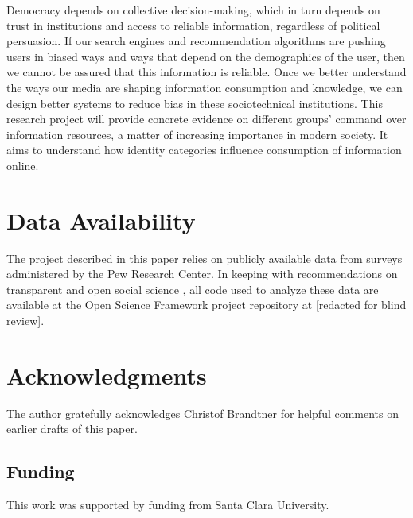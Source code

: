 \documentclass[11pt]{article}
\begin{document}
Democracy depends on collective decision-making, which in turn depends on trust
in institutions and access to reliable information, regardless of political
persuasion. If our search engines and recommendation algorithms are pushing
users in biased ways and ways that depend on the demographics of the user, then
we cannot be assured that this information is reliable. Once we better
understand the ways our media are shaping information consumption and knowledge,
we can design better systems to reduce bias in these sociotechnical
institutions. This research project will provide concrete evidence on different
groups' command over information resources, a matter of increasing importance in
modern society. It aims to understand how identity categories influence
consumption of information online.




\section{Data Availability}\label{sec:data-availability}

The project described in this paper relies on publicly available data from
surveys administered by the Pew Research Center.
In keeping with recommendations on transparent and open social science
\citep{Freese2018}, all code used to analyze these data are available at the
Open Science Framework project repository at [redacted for blind review].


\section{Acknowledgments}\label{sec:acknowledgments}

The author gratefully acknowledges Christof Brandtner for helpful comments on
earlier drafts of this paper.


\subsection{Funding}\label{sec:funding}
This work was supported by funding from Santa Clara University.


\newpage
\hypertarget{references}{%
\label{references}}
\renewcommand{\bibname}{References}



\end{document}
